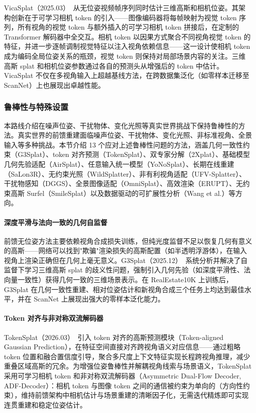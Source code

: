VicaSplat（2025.03）~\cite{2503_10286}从无位姿视频帧序列同时估计三维高斯和相机位姿。其架构创新在于可学习相机 token 的引入——图像编码器将每帧映射为视觉 token 序列，所有视角的视觉 token 与额外插入的可学习相机 token 拼接后，在定制的 Transformer 解码器中全交互。相机 token 以因果方式聚合不同视角视觉 token 的特征，并进一步逐帧调制视觉特征以注入视角依赖信息——这一设计使相机 token 成为编码全局位姿关系的瓶颈，视觉 token 则保持对局部场景内容的关注。三维高斯 splat 和相机位姿参数通过各自的预测头从增强后的 token 中估计。VicaSplat 不仅在多视角输入上超越基线方法，在跨数据集泛化（如零样本迁移至 ScanNet）上也展现出卓越性能。

\subsubsection{鲁棒性与特殊设置}

本路线介绍在噪声位姿、干扰物体、变化光照等真实世界挑战下保持鲁棒性的方法。真实世界的前馈重建面临噪声位姿、干扰物体、变化光照、非标准视角、全景输入等多种挑战。本节介绍 13 个应对上述鲁棒性问题的方法，涵盖几何一致性约束（G3Splat）、token 对齐预测（TokenSplat）、双专家分解（2Xplat）、基础模型几何先验适配（AirSplat）、任意输入统一模型（YoNoSplat）、长期在线重建（SaLon3R）、无约束光照（WildSplatter）、非有利视角适配（UFV-Splatter）、干扰物感知（DGGS）、全景图像适配（OmniSplat）、高效渲染（ERUPT）、无约束高斯 Surfel（SmileSplat）以及数据驱动的可扩展性分析（Wang et al.）等方向。

\paragraph{深度平滑与法向一致的几何自监督}

前馈无位姿方法主要依赖视角合成损失训练，但纯光度监督不足以恢复几何有意义的高斯——网络可以找到"欺骗"渲染损失的高斯配置（如半透明浮游体），在输入视角上渲染正确但在几何上毫无意义。G3Splat（2025.12）~\cite{2512_17547}系统分析并解决了自监督下学习三维高斯 splat 的歧义性问题，强制引入几何先验（如深度平滑性、法向量一致性）获得几何一致的三维场景表示。在 RealEstate10K 上训练后，G3Splat 在几何一致性重建、相对位姿估计和新视角合成三个任务上均达到最佳水平，并在 ScanNet 上展现出强大的零样本泛化能力。

\paragraph{Token 对齐与非对称双流解码器}

TokenSplat（2026.03）~\cite{2603_00697}引入 token 对齐的高斯预测模块（Token-aligned Gaussian Prediction），在特征空间直接对齐跨视角语义对应信息——通过粗略 token 位置和融合置信度引导，聚合多尺度上下文特征实现长程跨视角推理，减少重叠区域高斯的冗余。为增强位姿鲁棒性并解耦视角线索与场景语义，TokenSplat 采用可学习相机 token 和非对称双流解码器（Asymmetric Dual-Flow Decoder, ADF-Decoder）：相机 token 与图像 token 之间的通信被约束为单向的（方向性约束），维持前馈架构中相机估计与场景重建的清晰因子化，无需迭代精炼即可实现连贯重建和稳定位姿估计。

